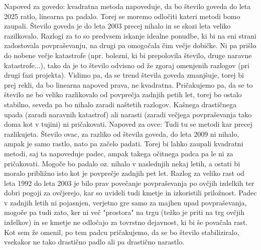 \documentclass[11pt,a4paper]{article}
\begin{document}
Napoved za govedo: kvadratna metoda napoveduje, da bo število goveda do leta 2025 ratlo, linearna pa padalo. Torej se moremo odločiti kateri metodi bomo zaupali. Število goveda je do leta 2003 precej nihalo in se skozi leta veliko razilkovalo. Razlogi za to so predvsem iskanje idealne ponudbe, ki bi na eni strani zadostovala povpraševanju, na drugi pa omogočala čim večje dobičke. Ni pa prišlo do nobene večje katastrofe (npr. bolezni, ki bi prepolovila število, druge naravne katastrofe...), tako da je to število odvisno od že zgoraj omenjenih razlogov (pri drugi fazi projekta). Vidimo pa, da se trend števila goveda zmanjšuje, torej bi prej rekli, da bo linearna napoved prava, ne kvadratna. Pričakujemo pa, da se to število ne bo veliko razlikovalo od povprečja zadnjih petih let, torej bo ostalo stabilno, seveda pa bo nihalo zaradi naštetih razlogov. Kašnega drastičnega upada (zaradi naravnih katastrof) ali narasti (zaradi večjega povpraševanja tako doma kot v tujini) ni pričakovati.
\newline
Napoved za ovce: Tudi tu se metodi kar precej razlikujeta. Število ovac, za razliko od števila goveda, do leta 2009 ni nihalo, ampak je samo rastlo, nato pa začelo padati. Torej bi lahko zaupali kvadratni metodi, saj ta napoveduje padec, ampak takega očitnega padca pa le ni za pričakovati. Mogoče bo padalo oz. nihalo v naslednjih nekaj letih, a ostati bi moralo približno isto kot je povprečje zadnjih pet let. Razlog za veliko rast od leta 1992 do leta 2003 je bilo prav povečanje povpraševanja po ovčjih izdelkih ter dobri pogoji za ovčjerejo, kar so uvideli tudi kmetje in izkoristili priložnost. Padec v zadnjih letih ni pojasnjen, verjetno gre samo za majhen upad povpraševanja, mogoče pa tudi zato, ker ni več "prostora" na trgu (težko je priti na trg ovčjih izdelkov) in se kmetje ne odločajo za tovrstno dejavnost, ki bi še povačala rast. Kot sem že omenil, po tem padcu pričakujemo, da se bo število stabiliziralo, vsekakor ne tako drastično padlo ali pa drastično narastlo.
\end{document}
